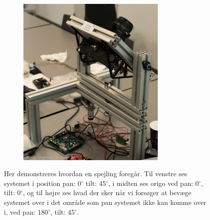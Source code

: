 \begin{figure}[!h]
\begin{subfigure}[b]{0.3\textwidth}
        \caption{}
        \label{fig:Nulpunkt}
    \end{subfigure}
    \begin{subfigure}[b]{0.3\textwidth}
        \includegraphics[width=0.8\textwidth]{Billeder/Tilt315deg.jpg}
        \caption{}
        \label{fig:tilt_spejl}
    \end{subfigure}
   \caption{Her demonstreres hvordan en spejling foregår. Til venstre ses systemet i position pan: 0$^{\circ}$ tilt: 45$^{\circ}$, i midten ses origo ved pan: 0$^{\circ}$, tilt: 0$^{\circ}$, og til højre ses hvad der sker når vi forsøger at bevæge systemet over i det område som pan systemet ikke kan komme over i, ved pan: 180$^{\circ}$, tilt: 45$^{\circ}$.}
\end{figure}

